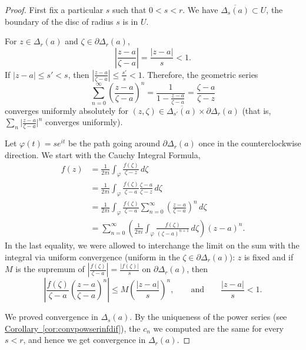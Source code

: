 \documentclass[12pt,openany]{book}
\newcommand{\sabs}[1]{\lvert {#1} \rvert}
\newcommand{\abs}[1]{\left\lvert {#1} \right\rvert}
\theoremstyle{plain}
\theoremstyle{remark}
\theoremstyle{definition}
\theoremstyle{exercise}
\theoremstyle{example}
\newcommand{\corref}[1]{\hyperref[#1]{Corollary~\ref*{#1}}}
\begin{document}
\begin{proof}
First fix a particular $s$ such that $0 < s < r$.
We have $\overline{\Delta_s(a)} \subset U$,
the boundary of the disc of radius $s$ is in $U$.

For $z \in \Delta_r(a)$ and $\zeta \in \partial \Delta_r(a)$, 
\begin{equation*}
\abs{\frac{z-a}{\zeta-a}} =
\frac{\sabs{z-a}}{s} < 1 .
\end{equation*}
If $\sabs{z-a} \leq s' < s$, then
$\abs{\frac{z-a}{\zeta-a}} \leq \frac{s'}{s} < 1$.  Therefore,
the geometric series
\begin{equation*}
\sum_{n=0}^\infty
{\left(\frac{z-a}{\zeta-a}\right)}^n
=
\frac{1}{1-
\frac{z-a}{\zeta-a}}
=
\frac{\zeta-a}{\zeta-z}
\end{equation*}
converges uniformly absolutely for $(z,\zeta) \in \overline{\Delta_{s'}(a)}
\times \partial \Delta_r(a)$ (that is, $\sum_n {\bigl\lvert
\frac{z-a}{\zeta-a} \bigr\rvert}^n$
converges uniformly).

Let $\varphi(t) = s e^{i t}$
be the path going around 
$\partial \Delta_r(a)$ once in the counterclockwise direction.
We start with the Cauchy Integral Formula,
\begin{equation*}
\begin{split}
f(z)
& =
\frac{1}{2\pi i}
\int_{\varphi}
\frac{f(\zeta)}{\zeta-z}
\,
d \zeta 
\\
& =
\frac{1}{2\pi i}
\int_{\varphi}
\frac{f(\zeta)}{\zeta-a}
\frac{\zeta-a}{\zeta-z}
\,
d \zeta 
\\
& =
\frac{1}{2\pi i}
\int_{\varphi}
\frac{f(\zeta)}{\zeta-a}
\sum_{n=0}^\infty
{\left(\frac{z-a}{\zeta-a}\right)}^n
\,
d \zeta 
\\
& =
\sum_{n=0}^\infty
\left(
\frac{1}{2\pi i}
\int_{\varphi}
\frac{f(\zeta)}{{(\zeta-a)}^{n+1}}
\,
d \zeta 
\right)
{(z-a)}^n .
\end{split}
\end{equation*}
In the last equality, we were allowed to 
interchange the limit on the sum with the integral
via uniform convergence (uniform in the $\zeta \in \partial \Delta_r(a)$):
$z$ is fixed and if $M$ is the supremum of $\abs{\frac{f(\zeta)}{\zeta-a}} =
\frac{\sabs{f(\zeta)}}{s}$ on $\partial \Delta_r(a)$,
then
\begin{equation*}
\abs{
\frac{f(\zeta)}{\zeta-a}
{\left(\frac{z-a}{\zeta-a}\right)}^n
}
\leq
M 
{\left(\frac{\abs{z-a}}{s}\right)}^n,
\qquad \text{and} \qquad
\frac{\abs{z-a}}{s} < 1 .
\end{equation*}

We proved convergence in $\Delta_s(a)$.
By the uniqueness of the power series (see \corref{cor:convpowserinfdif}),
the $c_n$ we computed are the same for every $s < r$, and hence
we get convergence in $\Delta_r(a)$.
\end{proof}
\end{document}
